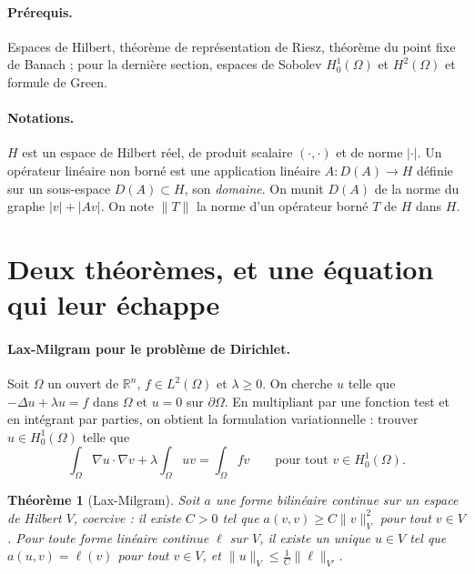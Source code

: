 \documentclass[11pt,a4paper]{article}
\theoremstyle{plain}
\newtheorem{theoreme}{Théorème}[section]
\theoremstyle{definition}
\theoremstyle{remark}
\newcommand{\R}{\mathbb{R}}
\begin{document}
\paragraph{Prérequis.} Espaces de Hilbert, théorème de représentation de Riesz, théorème du point fixe de Banach ; pour la dernière section, espaces de Sobolev $H^1_0(\Omega)$ et $H^2(\Omega)$ et formule de Green.

\paragraph{Notations.} $H$ est un espace de Hilbert réel, de produit scalaire $(\cdot,\cdot)$ et de norme $|\cdot|$. Un opérateur linéaire non borné est une application linéaire $A : D(A)\to H$ définie sur un sous-espace $D(A)\subset H$, son \emph{domaine}. On munit $D(A)$ de la norme du graphe $|v|+|Av|$. On note $\|T\|$ la norme d'un opérateur borné $T$ de $H$ dans $H$.

\tableofcontents

\section{Deux théorèmes, et une équation qui leur échappe}

\paragraph{Lax-Milgram pour le problème de Dirichlet.} Soit $\Omega$ un ouvert de $\R^n$, $f\in L^2(\Omega)$ et $\lambda\geq0$. On cherche $u$ telle que $-\Delta u+\lambda u=f$ dans $\Omega$ et $u=0$ sur $\partial\Omega$. En multipliant par une fonction test et en intégrant par parties, on obtient la formulation variationnelle : trouver $u\in H^1_0(\Omega)$ telle que
\[
  \int_\Omega\nabla u\cdot\nabla v+\lambda\int_\Omega uv=\int_\Omega fv\qquad\text{pour tout }v\in H^1_0(\Omega).
\]

\begin{theoreme}[Lax-Milgram]\label{thm:lm}
Soit $a$ une forme bilinéaire continue sur un espace de Hilbert $V$, \emph{coercive} : il existe $C>0$ tel que $a(v,v)\geq C\|v\|_V^2$ pour tout $v\in V$. Pour toute forme linéaire continue $\ell$ sur $V$, il existe un unique $u\in V$ tel que $a(u,v)=\ell(v)$ pour tout $v\in V$, et $\|u\|_V\leq\frac1C\|\ell\|_{V'}$.
\end{theoreme}
\end{document}
